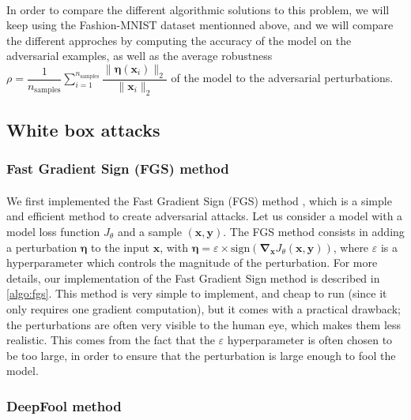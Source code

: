 \documentclass[11pt,twocolumn,letterpaper]{article}
\begin{document}
\paragraph{} In order to compare the different algorithmic solutions to this problem, we will keep using the Fashion-MNIST dataset mentionned above, and we will compare the different approches by computing the accuracy of the model on the adversarial examples, as well as the average robustness $\rho = \displaystyle \dfrac{1}{n_{\text{samples}}} \sum \limits_{i=1}^{n_{\text{samples}}} \dfrac{\|\bm{\eta}(\bm{x}_i)\|_2}{\|\bm{x}_i\|_2}$ of the model to the adversarial perturbations.

\subsection{White box attacks}

\subsubsection{Fast Gradient Sign (FGS) method}

\paragraph{} We first implemented the Fast Gradient Sign (FGS) method \cite{fast_gradient_sign}, which is a simple and efficient method to create adversarial attacks. Let us consider a model with a model loss function $J_{\theta}$ and a sample $(\bm{x}, \bm{y})$. The FGS method consists in adding a perturbation $\bm{\eta}$ to the input $\bm{x}$, with $\bm{\eta} = \varepsilon \times \text{sign}(\bm{\nabla}_{\bm{x}} J_{\theta}(\bm{x}, \bm{y}))$, where $\varepsilon$ is a hyperparameter which controls the magnitude of the perturbation. For more details, our implementation of the Fast Gradient Sign method is described in \ref{algo:fgs}. This method is very simple to implement, and cheap to run (since it only requires one gradient computation), but it comes with a practical drawback; the perturbations are often very visible to the human eye, which makes them less realistic. This comes from the fact that the $\varepsilon$ hyperparameter is often chosen to be too large, in order to ensure that the perturbation is large enough to fool the model. 

\subsubsection{DeepFool method}
\end{document}
